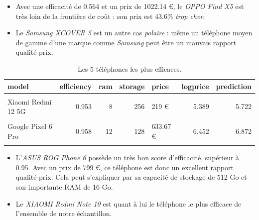 \documentclass[
  12pt,
]{report}
\begin{document}
\newpage

\begin{itemize}
\item
  Avec une efficacité de 0.564 et un prix de 1022.14 €, le \emph{OPPO
  Find X5} est très loin de la frontière de coût : son prix est 43.6\%
  \emph{trop cher}.
\item
  Le \emph{Samsung XCOVER 5} est un autre cas \emph{polaire} : même un
  téléphone moyen de gamme d'une marque comme \emph{Samsung} peut être
  un mauvais rapport qualité-prix.
\end{itemize}

\begin{table}[!h]

\caption{\label{tab:best}Les 5 téléphones les plus efficaces.}
\centering
\begin{tabular}[t]{lrrrlrr}
\toprule
\textbf{model} & \textbf{efficiency} & \textbf{ram} & \textbf{storage} & \textbf{price} & \textbf{logprice} & \textbf{prediction}\\
\midrule
\cellcolor{gray!6}{iPhone 8 Plus} & \cellcolor{gray!6}{0.952} & \cellcolor{gray!6}{3} & \cellcolor{gray!6}{64} & \cellcolor{gray!6}{299 €} & \cellcolor{gray!6}{5.700} & \cellcolor{gray!6}{6.009}\\
Xiaomi Redmi 12 5G & 0.953 & 8 & 256 & 219 € & 5.389 & 5.722\\
\cellcolor{gray!6}{ASUS ROG Phone 6} & \cellcolor{gray!6}{0.958} & \cellcolor{gray!6}{16} & \cellcolor{gray!6}{512} & \cellcolor{gray!6}{799 €} & \cellcolor{gray!6}{6.683} & \cellcolor{gray!6}{7.101}\\
Google Pixel 6 Pro & 0.958 & 12 & 128 & 633.67 € & 6.452 & 6.872\\
\cellcolor{gray!6}{XIAOMI Redmi Note 10} & \cellcolor{gray!6}{0.963} & \cellcolor{gray!6}{4} & \cellcolor{gray!6}{64} & \cellcolor{gray!6}{159 €} & \cellcolor{gray!6}{5.069} & \cellcolor{gray!6}{5.591}\\
\bottomrule
\end{tabular}
\end{table}

\begin{itemize}
\item
  L'\emph{ASUS ROG Phone 6} possède un très bon score d'efficacité,
  supérieur à 0.95. Avec un prix de 799 €, ce téléphone est donc un
  excellent rapport qualité-prix. Cela peut s'expliquer par sa capacité
  de stockage de 512 Go et son importante RAM de 16 Go.
\item
  Le \emph{XIAOMI Redmi Note 10} est quant à lui le téléphone le plus
  efficace de l'ensemble de notre échantillon.
\end{itemize}
\end{document}
